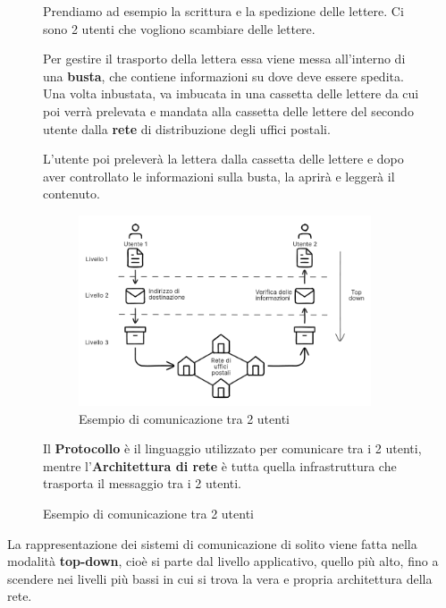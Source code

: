 \documentclass[a4paper]{article}
\theoremstyle{break}
\theoremstyle{break}
\theoremstyle{break}
\theoremstyle{break}
\begin{document}
\begin{figure}[H]
  \begin{example}
    Prendiamo ad esempio la scrittura e la spedizione delle lettere. Ci sono 2
    utenti che vogliono scambiare delle lettere.
    
    Per gestire il trasporto della
    lettera essa viene messa all'interno di una \textbf{busta}, che contiene informazioni
    su dove deve essere spedita. Una volta inbustata, va imbucata in una cassetta 
    delle lettere da cui poi verrà prelevata e mandata alla cassetta delle lettere 
    del secondo utente dalla \textbf{rete} di distribuzione degli uffici postali.

    L'utente poi preleverà la lettera dalla cassetta delle lettere e dopo aver
    controllato le informazioni sulla busta, la aprirà e leggerà il contenuto.
    \begin{figure}[H]
      \begin{center}
        \includegraphics[width=0.95\textwidth]{rete-postale}
      \end{center}
      \caption{Esempio di comunicazione tra 2 utenti}
    \end{figure}

    Il \textbf{Protocollo} è il linguaggio utilizzato per comunicare tra i 2
    utenti, mentre l'\textbf{Architettura di rete} è tutta quella infrastruttura
    che trasporta il messaggio tra i 2 utenti.
  \end{example}
\end{figure}

\noindent
La rappresentazione dei sistemi di comunicazione di solito viene fatta nella modalità
\textbf{top-down}, cioè si parte dal livello applicativo, quello più alto, fino a scendere
nei livelli più bassi in cui si trova la vera e propria architettura della rete.
\end{document}

